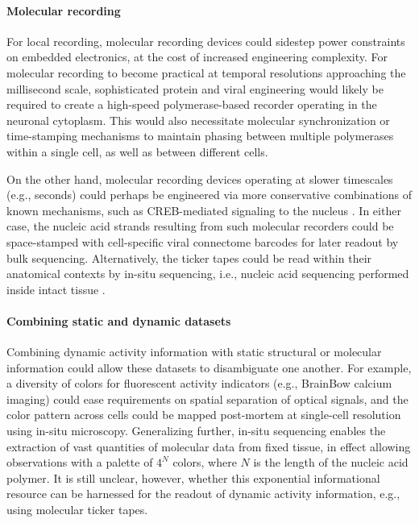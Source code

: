 \paragraph{Molecular recording}  For local recording, molecular recording devices could sidestep power constraints on embedded electronics, at the cost of increased engineering complexity. For molecular recording to become practical at temporal resolutions approaching the millisecond scale, sophisticated protein and viral engineering would likely be required to create a high-speed polymerase-based recorder operating in the neuronal cytoplasm. This would also necessitate molecular synchronization or time-stamping mechanisms to maintain phasing between multiple polymerases within a single cell, as well as between different cells.

On the other hand, molecular recording devices operating at slower timescales (e.g., seconds) could perhaps be engineered via more conservative combinations of known mechanisms, such as CREB-mediated signaling to the nucleus \cite{Deisseroth2012}. In either case, the nucleic acid strands resulting from such molecular recorders could be space-stamped with cell-specific viral connectome barcodes \cite{zador12} for later readout by bulk sequencing. Alternatively, the ticker tapes could be read within their anatomical contexts by in-situ sequencing, i.e., nucleic acid sequencing performed inside intact tissue \cite{Lee2013InSitu}.

\paragraph{Combining static and dynamic datasets} Combining dynamic activity information with static structural or molecular information could allow these datasets to disambiguate one another. For example, a diversity of colors for fluorescent activity indicators (e.g., BrainBow calcium imaging) could ease requirements on spatial separation of optical signals, and the color pattern across cells could be mapped post-mortem at single-cell resolution using in-situ microscopy. Generalizing further, in-situ sequencing enables the extraction of vast quantities of molecular data from fixed tissue, in effect allowing observations with a palette of $4^N$ colors, where $N$ is the length of the nucleic acid polymer. It is still unclear, however, whether this exponential informational resource can be harnessed for the readout of dynamic activity information, e.g., using molecular ticker tapes.

